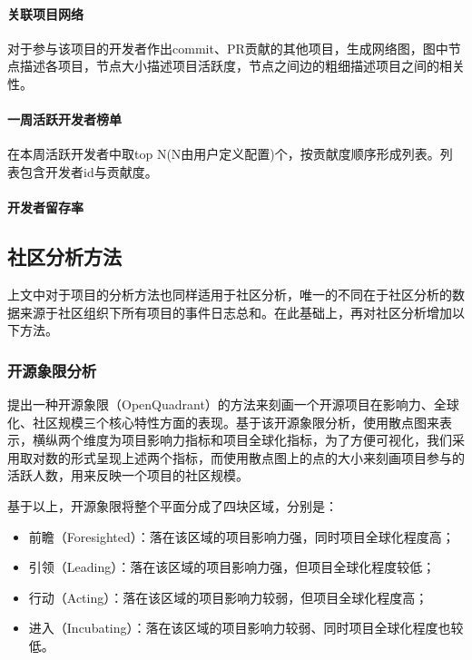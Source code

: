 \paragraph{关联项目网络} 对于参与该项目的开发者作出commit、PR贡献的其他项目，生成网络图，图中节点描述各项目，节点大小描述项目活跃度，节点之间边的粗细描述项目之间的相关性。
\paragraph{一周活跃开发者榜单} 在本周活跃开发者中取top N(N由用户定义配置)个，按贡献度顺序形成列表。列表包含开发者id与贡献度。
\paragraph{开发者留存率}

\subsection{社区分析方法}
\par 上文中对于项目的分析方法也同样适用于社区分析，唯一的不同在于社区分析的数据来源于社区组织下所有项目的事件日志总和。在此基础上，再对社区分析增加以下方法。
\subsubsection{开源象限分析}
提出一种开源象限（OpenQuadrant）的方法来刻画一个开源项目在影响力、全球化、社区规模三个核心特性方面的表现。基于该开源象限分析，使用散点图来表示，横纵两个维度为项目影响力指标和项目全球化指标，为了方便可视化，我们采用取对数的形式呈现上述两个指标，而使用散点图上的点的大小来刻画项目参与的活跃人数，用来反映一个项目的社区规模。

基于以上，开源象限将整个平面分成了四块区域，分别是：
\begin{itemize}
    \item 前瞻（Foresighted）：落在该区域的项目影响力强，同时项目全球化程度高；
    \item 引领（Leading）：落在该区域的项目影响力强，但项目全球化程度较低；
    \item 行动（Acting）：落在该区域的项目影响力较弱，但项目全球化程度高；
    \item 进入（Incubating）：落在该区域的项目影响力较弱、同时项目全球化程度也较低。
\end{itemize}




